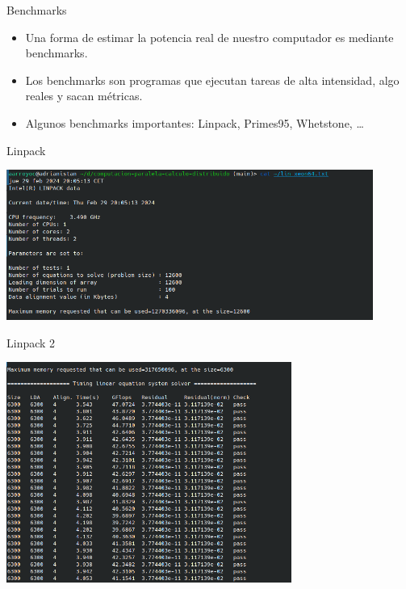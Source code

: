 \documentclass[bigger]{beamer}
\begin{document}
\begin{frame}[label={sec:orgc7174df}]{Benchmarks}
\begin{itemize}
\item Una forma de estimar la potencia real de nuestro computador es mediante benchmarks.

\item Los benchmarks son programas que ejecutan tareas de alta intensidad, algo reales y sacan métricas.

\item Algunos benchmarks importantes: Linpack, Primes95, Whetstone, \ldots{}
\end{itemize}
\end{frame}

\begin{frame}[label={sec:orgc39503c}]{Linpack}
\begin{center}
\includegraphics[width=0.9\textwidth]{./Linpack1.png}
\end{center}
\end{frame}

\begin{frame}[label={sec:org1e69991}]{Linpack 2}
\begin{center}
\includegraphics[width=0.7\textwidth]{./Linpack2.png}
\end{center}
\end{frame}
\end{document}
